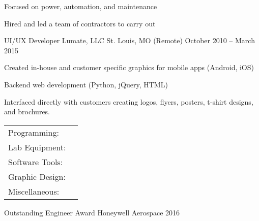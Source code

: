 \documentclass[]{awesome-cv}
\begin{document}
\begin{cventries}
{\begin{cvitems}
		\item {Focused on power, automation, and maintenance}
		\item {Hired and led a team of contractors to carry out}
		\end{cvitems}}
	\cventry
	{UI/UX Developer}
	{Lumate, LLC}
	{St. Louis, MO (Remote)}
	{October 2010 – March 2015}
	{\begin{cvitems}
		\item {Created in-house and customer specific graphics for mobile apps (Android, iOS)}
		\item {Backend web development (Python, jQuery, HTML)}
		\item {Interfaced directly with customers creating logos, flyers, posters, t-shirt designs, and brochures.}
		\end{cvitems}}
\end{cventries}
\begin{cventries}
	\cventry
	{}
	{\def\arraystretch{1.15}{\begin{tabular}{ l l }
		Programming:  & {\skill{ VB.NET, Python, Java, MATLAB, Powershell, Github, Subversion, TestStand, ADB, VISA}} \\
		Lab Equipment:  & {\skill{ Oscilloscopes, DMM, VNA, power supplies, multi-meters, Raspberry Pi, Arduino, PXI}} \\
		Software Tools:  & {\skill{ Schematic capture, PCB layout, Mentor Graphics, CADSTAR, OrCad, SPICE, Solidworks, CAD}} \\
		Graphic Design:  & {\skill{ Photoshop, Illustrator, LaTeX}} \\
		Miscellaneous:  & {\skill{ MS Office, MS Project, Excel, Android, Linux, Windows, Jira}} \\
		\end{tabular}}}
	{}
	{}
	{}
\end{cventries}

\vspace{-7mm}

\begin{cvhonors}
	\cvhonor
	{Outstanding Engineer Award}
	{Honeywell Aerospace }
	{}
	{2016}
\end{cvhonors}
\ 
\end{document}
